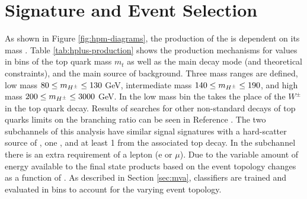 	\section{Signature and Event Selection}\label{sec:signal}
		As shown in Figure \ref{fig:hpm-diagrams}, the production of the \Hpm is dependent on its mass \mHpm. Table \ref{tab:hplus-production} shows the production mechanisms for \mHpm values in bins of the top quark mass $m_t$ as well as the main decay mode (and theoretical constraints), and the main source of background. Three mass ranges are defined, low mass $80 \leq m_{H^{\pm}} \leq 130 $ GeV, intermediate mass $140 \leq m_{H^{\pm}} \leq 190$, and high mass $200 \leq m_{H^{\pm}} \leq 3000$ GeV. In the low mass bin the \Hpm takes the place of the $W^{\pm}$ in the top quark decay. Results of searches for other non-standard decays of top quarks limits on the branching ratio can be seen in Reference \cite{pdg}. The two subchannels of this analysis have similar signal signatures with a hard-scatter source of \Etm, one \tauhad, and at least 1 \bjet from the associated top decay. In the \taulep subchannel there is an extra requirement of a lepton (e or $\mu$). Due to the variable amount of energy available to the final state products based on \mHpm the event topology changes as a function of \mHpm. As described in Section \ref{sec:mva}, classifiers are trained and evaluated in \mHpm bins to account for the varying event topology.

